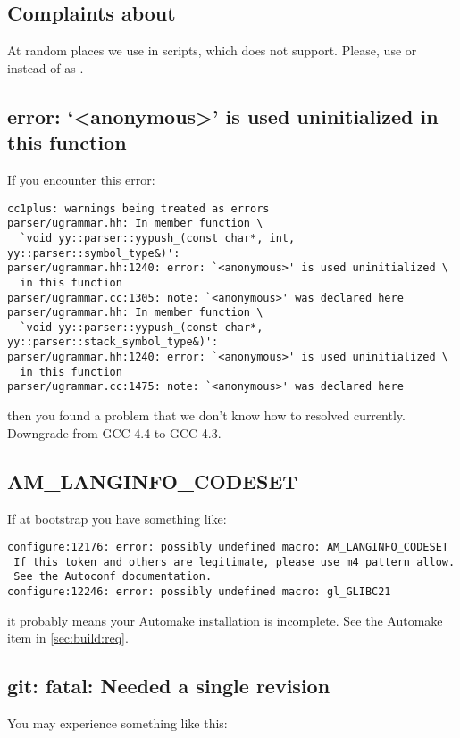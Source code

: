 \subsection{Complaints about \samp{+=}}
At random places we use \samp{+=} in  scripts, which
 does not support.  Please, use  or
 instead of  as .

\subsection{error: `<anonymous>' is used uninitialized in this function}
If you encounter this error:

\begin{lstlisting}[language={}]
cc1plus: warnings being treated as errors
parser/ugrammar.hh: In member function \
  `void yy::parser::yypush_(const char*, int, yy::parser::symbol_type&)':
parser/ugrammar.hh:1240: error: `<anonymous>' is used uninitialized \
  in this function
parser/ugrammar.cc:1305: note: `<anonymous>' was declared here
parser/ugrammar.hh: In member function \
  `void yy::parser::yypush_(const char*, yy::parser::stack_symbol_type&)':
parser/ugrammar.hh:1240: error: `<anonymous>' is used uninitialized \
  in this function
parser/ugrammar.cc:1475: note: `<anonymous>' was declared here
\end{lstlisting}

\noindent
then you found a problem that we don't know how to resolved currently.
Downgrade from GCC-4.4 to GCC-4.3.

\subsection{AM\_LANGINFO\_CODESET}

If at bootstrap you have something like:

\begin{lstlisting}[language={}]
configure:12176: error: possibly undefined macro: AM_LANGINFO_CODESET
 If this token and others are legitimate, please use m4_pattern_allow.
 See the Autoconf documentation.
configure:12246: error: possibly undefined macro: gl_GLIBC21
\end{lstlisting}

\noindent
it probably means your Automake installation is incomplete.  See the
Automake item in \autoref{sec:build:req}.

\subsection{git: fatal: Needed a single revision}
You may experience something like this:


